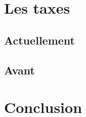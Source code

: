 \documentclass[a4paper, 14pt]{extarticle}
\begin{document}
	\section{Les taxes}
	\subsection{Actuellement}  
	\subsection{Avant}
	\section{Conclusion}
		  
		
	\pagebreak
      
  \tableofcontents
\end{document}

